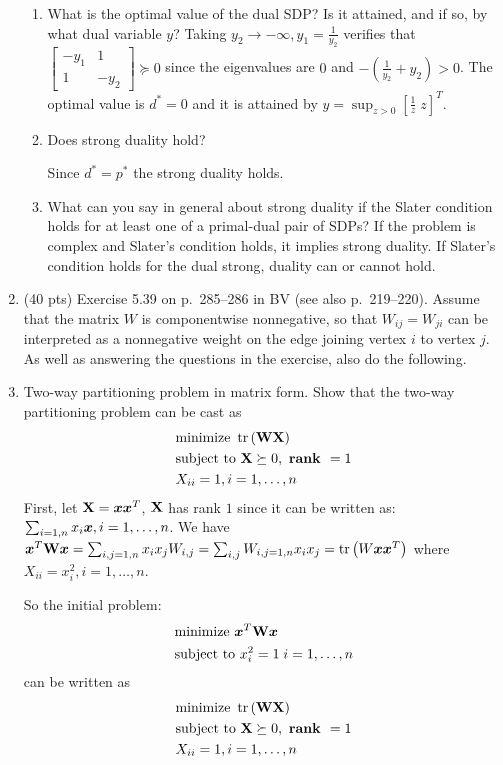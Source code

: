 \documentclass[11pt]{article}
\newcommand{\st}{\text{subject to }}
\newcommand{\minz}{\text{minimize }}
\newcommand{\twomat}[4]{\begin{bmatrix} #1 & #2 \\ #3 & #4 \end{bmatrix}}
\begin{document}
\begin{enumerate}
\begin{enumerate}
\item What is the optimal value of the dual SDP? Is it attained, and if so, by what dual variable $y$?
Taking $y_2 \to -\infty, y_1 = \frac{1}{y_2}$ verifies that $ \twomat{-y_1}{1}{1}{-y_2} \succeq 0 $ since the eigenvalues are $0$ and $ -(\frac{1}{y_2} + y_2) > 0$.
The optimal value is $d^* = 0$ and it is attained by $y = \sup_{z > 0} [\frac{1}{z} \; z]^T$.

\item Does strong duality hold?

Since $d^* = p^*$ the strong duality holds.

\item What can you say in general about strong duality if the Slater condition holds for at least one of
a primal-dual pair of SDPs?
If the problem is complex and Slater's condition holds, it implies strong duality. If Slater's condition holds for the dual strong, duality can or cannot hold.


\end{enumerate}
\item (40 pts) Exercise 5.39 on p.~285--286 in BV (see also p.~219--220). 
Assume that the matrix $W$ is componentwise nonnegative, so that $W_{ij}=W_{ji}$ can be interpreted as a 
nonnegative weight on the edge joining vertex $i$ to vertex $j$. As well as answering the questions in the exercise, also do the following.\\
\be
	\item Two-way partitioning problem in matrix form. Show that the two-way partitioning problem can be cast as
\begin{align*}
	& \minz \tr{\mat{W} \mat{ X}} \\
	& \st\mat{X} \succeq 0, \text{ \textbf{rank }}  = 1 \\
	&	X_{ii} = 1, i =1, \ldots, n
\end{align*}
First, let ${\mathbf X} = \bm{x} \bm{x}^T$,  ${\mathbf X}$ has rank $1$ since it can be written as: $\sum_{i=1,n} x_i \bm{x}, i=1, \dots, n$. 
We have $\bm{x}^T {\mathbf W} \bm{x} = \sum_{i,j=1,n} x_i x_j W_{i,j} =  \sum_{i,j} W_{i,j=1,n} x_i x_j  = \operatorname{tr}\left( W \bm{x} \bm{x}^T \right)$ where $X_{ii} = x_i^2,  i=1, \dots, n$.

So the initial problem:
\begin{align*}
	& \minz \vect{x}^T \mat{W} \vect{x} \\
	& \st x_i^2 = 1 \; i =1, \ldots, n
\end{align*}
can be written as
\begin{align*}
	& \minz \tr{\mat{W} \mat{ X}} \\
	& \st\mat{X} \succeq 0, \text{ \textbf{rank }}  = 1 \\
	&	X_{ii} = 1, i =1, \ldots, n
\end{align*}


\end{enumerate}
\end{document}
